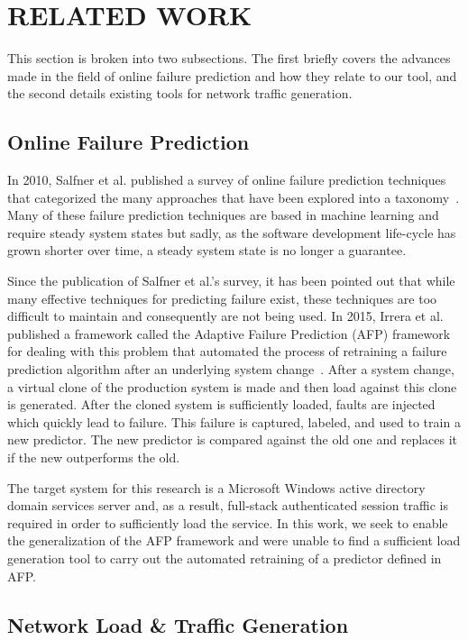 \section{\uppercase{Related Work}} \label{sec:relatedWork} 
\noindent This section is broken into two subsections.  The first briefly
covers the advances made in the field of online failure prediction and how they
relate to our tool, and the second details existing tools for network traffic
generation.

\subsection{Online Failure Prediction}
\noindent In 2010, Salfner et al. published a survey of online failure
prediction techniques that categorized the many approaches that have been
explored into a taxonomy~\cite{salfnerSurvey}.  Many of these failure
prediction techniques are based in machine learning and require steady system
states but sadly, as the software development life-cycle has grown shorter over
time, a steady system state is no longer a guarantee.

Since the publication of Salfner et al.'s survey, it has been pointed out that
while many effective techniques for predicting failure exist, these techniques
are too difficult to maintain and consequently are not being used.  In 2015,
Irrera et al. published a framework called the Adaptive Failure Prediction
(AFP) framework for dealing with this problem that automated the process of
retraining a failure prediction algorithm after an underlying system
change~\cite{irrera2015}.  After a system change, a virtual clone of the
production system is made and then load against this clone is generated.  After
the cloned system is sufficiently loaded, faults are injected which quickly
lead to failure.  This failure is captured, labeled, and used to train a new
predictor.  The new predictor is compared against the old one and replaces it
if the new outperforms the old.

The target system for this research is a Microsoft Windows active directory
domain services server and, as a result, full-stack authenticated session
traffic is required in order to sufficiently load the service.  In this work,
we seek to enable the generalization of the AFP framework and were unable to
find a sufficient load generation tool to carry out the automated retraining of
a predictor defined in AFP.

\subsection{Network Load \& Traffic Generation}

